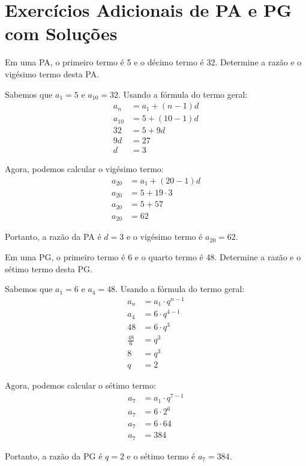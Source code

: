 \documentclass[12pt,a4paper]{article}
\begin{document}
\section{Exercícios Adicionais de PA e PG com Soluções}

\begin{tcolorbox}[colback=blue!5!white,colframe=blue!75!black,title=Exercício Adicional 1]
Em uma PA, o primeiro termo é 5 e o décimo termo é 32. Determine a razão e o vigésimo termo desta PA.
\end{tcolorbox}

\begin{tcolorbox}[colback=green!5!white,colframe=green!75!black,title=Resolução]
Sabemos que $a_1 = 5$ e $a_{10} = 32$. Usando a fórmula do termo geral:
\begin{align}
a_n &= a_1 + (n-1)d\\
a_{10} &= 5 + (10-1)d\\
32 &= 5 + 9d\\
9d &= 27\\
d &= 3
\end{align}

Agora, podemos calcular o vigésimo termo:
\begin{align}
a_{20} &= a_1 + (20-1)d\\
a_{20} &= 5 + 19 \cdot 3\\
a_{20} &= 5 + 57\\
a_{20} &= 62
\end{align}

Portanto, a razão da PA é $d = 3$ e o vigésimo termo é $a_{20} = 62$.
\end{tcolorbox}

\begin{tcolorbox}[colback=blue!5!white,colframe=blue!75!black,title=Exercício Adicional 2]
Em uma PG, o primeiro termo é 6 e o quarto termo é 48. Determine a razão e o sétimo termo desta PG.
\end{tcolorbox}

\begin{tcolorbox}[colback=green!5!white,colframe=green!75!black,title=Resolução]
Sabemos que $a_1 = 6$ e $a_4 = 48$. Usando a fórmula do termo geral:
\begin{align}
a_n &= a_1 \cdot q^{n-1}\\
a_4 &= 6 \cdot q^{4-1}\\
48 &= 6 \cdot q^3\\
\frac{48}{6} &= q^3\\
8 &= q^3\\
q &= 2
\end{align}

Agora, podemos calcular o sétimo termo:
\begin{align}
a_7 &= a_1 \cdot q^{7-1}\\
a_7 &= 6 \cdot 2^6\\
a_7 &= 6 \cdot 64\\
a_7 &= 384
\end{align}

Portanto, a razão da PG é $q = 2$ e o sétimo termo é $a_7 = 384$.
\end{tcolorbox}
\end{document}
